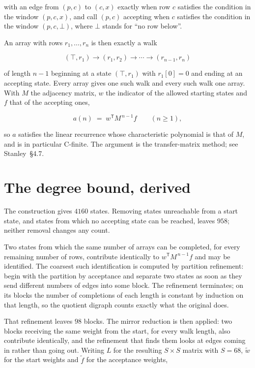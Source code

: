 \documentclass[11pt]{article}
\theoremstyle{definition}
\begin{document}
with an edge from $(p,c)$ to $(c,x)$ exactly when row $c$ satisfies the condition in the window $(p,c,x)$, and call $(p,c)$ accepting when $c$ satisfies the condition in the window $(p,c,\bot)$, where $\bot$ stands for ``no row below''.

An array with rows $r_1,\dots,r_n$ is then exactly a walk

\[(\top,r_1) \to (r_1,r_2) \to \cdots \to (r_{n-1},r_n)\]

of length $n-1$ beginning at a state $(\top,r_1)$ with $r_1[0]=0$ and ending at an accepting state. Every array gives one such walk and every such walk one array. With $M$ the adjacency matrix, $w$ the indicator of the allowed starting states and $f$ that of the accepting ones,

\[a(n) \;=\; w^{\mathsf T} M^{\,n-1} f \qquad (n \ge 1),\]

so $a$ satisfies the linear recurrence whose characteristic polynomial is that of $M$, and is in particular C-finite. The argument is the transfer-matrix method; see Stanley~\S4.7.

\section{The degree bound, derived}

The construction gives $4160$ states. Removing states unreachable from a start state, and states from which no accepting state can be reached, leaves $958$; neither removal changes any count.

Two states from which the same number of arrays can be completed, for every remaining number of rows, contribute identically to $w^{\mathsf T}M^{\,n-1}f$ and may be identified. The coarsest such identification is computed by partition refinement: begin with the partition by acceptance and separate two states as soon as they send different numbers of edges into some block. The refinement terminates; on its blocks the number of completions of each length is constant by induction on that length, so the quotient digraph counts exactly what the original does.

That refinement leaves $98$ blocks. The mirror reduction is then applied: two blocks receiving the same weight from the start, for every walk length, also contribute identically, and the refinement that finds them looks at edges coming in rather than going out. Writing $L$ for the resulting $S \times S$ matrix with $S = 68$, $\tilde w$ for the start weights and $\tilde f$ for the acceptance weights,
\end{document}
